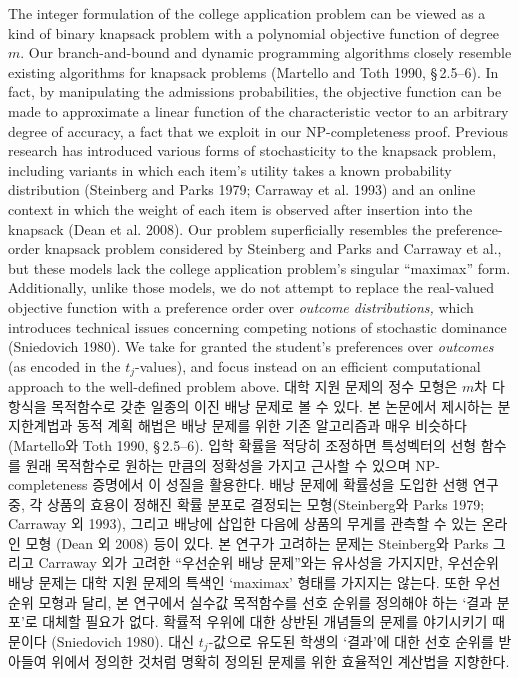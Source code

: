\documentclass[11pt]{article} %
\theoremstyle{definition}
\theoremstyle{definition}
\begin{document}
\ifen
The integer formulation of the college application problem can be viewed as a kind of binary knapsack problem with a polynomial objective function of degree $m$. Our branch-and-bound and dynamic programming algorithms closely resemble existing algorithms for knapsack problems (Martello and Toth 1990, \S\,2.5--6). In fact, by manipulating the admissions probabilities, the objective function can be made to approximate a linear function of the characteristic vector to an arbitrary degree of accuracy, a fact that we exploit in our NP-completeness proof. Previous research has introduced various forms of stochasticity to the knapsack problem, including variants in which each item's utility takes a known probability distribution (Steinberg and Parks 1979; Carraway et al. 1993) and an online context in which the weight of each item is observed after insertion into the knapsack (Dean et al. 2008). Our problem superficially resembles the preference-order knapsack problem considered by Steinberg and Parks and Carraway et al., but these models lack the college application problem's singular ``maximax'' form. Additionally, unlike those models, we do not attempt to replace the real-valued objective function with a preference order over \emph{outcome distributions,} which introduces technical issues concerning competing notions of stochastic dominance (Sniedovich 1980). We take for granted the student's preferences over \emph{outcomes} (as encoded in the $t_j$-values), and focus instead on an efficient computational approach to the well-defined problem above.
\else
대학 지원 문제의 정수 모형은 $m$차 다항식을 목적함수로 갖춘 일종의 이진 배낭 문제로 볼 수 있다. 본 논문에서 제시하는 분지한계법과 동적 계획 해법은 배낭 문제를 위한 기존 알고리즘과 매우 비슷하다 (Martello와 Toth 1990, \S\,2.5--6). 입학 확률을 적당히 조정하면 특성벡터의 선형 함수를 원래 목적함수로 원하는 만큼의 정확성을 가지고 근사할 수 있으며 NP-completeness 증명에서 이 성질을 활용한다. 배낭 문제에 확률성을 도입한 선행 연구 중, 각 상품의 효용이 정해진 확률 분포로 결정되는 모형(Steinberg와 Parks 1979; Carraway 외 1993), 그리고 배낭에 삽입한 다음에 상품의 무게를 관측할 수 있는 온라인 모형 (Dean 외 2008) 등이 있다. 본 연구가 고려하는 문제는 Steinberg와 Parks 그리고 Carraway 외가 고려한 ``우선순위 배낭 문제''와는 유사성을 가지지만, 우선순위 배낭 문제는 대학 지원 문제의 특색인 `maximax' 형태를 가지지는 않는다. 또한 우선순위 모형과 달리, 본 연구에서 실수값 목적함수를 선호 순위를 정의해야 하는 `결과 분포'로 대체할 필요가 없다. 확률적 우위에 대한 상반된 개념들의 문제를 야기시키기 때문이다 (Sniedovich 1980). 대신 $t_j$-값으로 유도된 학생의 `결과'에 대한 선호 순위를 받아들여 위에서 정의한 것처럼 명확히 정의된 문제를 위한 효율적인 계산법을 지향한다.
\fi
\end{document}
